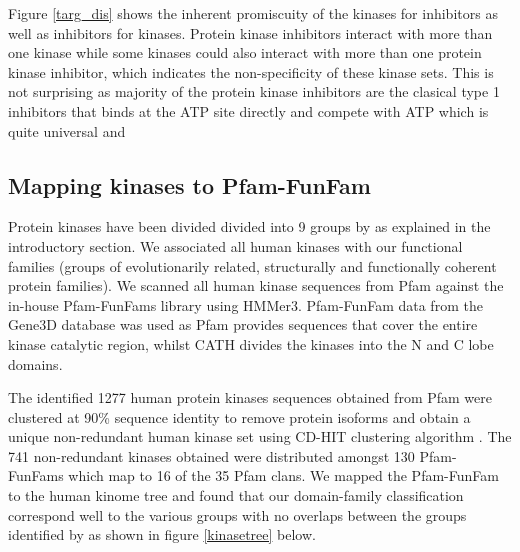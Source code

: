 \documentclass[a4paper, 11pt]{article}
\newcommand{\redcomment}[1]{\textcolor{red}{[#1]}} %
\begin{document}
Figure \ref{targ_dis} shows the inherent promiscuity of the kinases for inhibitors as well as inhibitors for kinases. Protein kinase inhibitors interact with more than one kinase  while some kinases could also interact with more than one protein kinase inhibitor, which indicates the non-specificity of these kinase sets. This is not surprising as majority of the protein kinase inhibitors are the clasical type 1 inhibitors that binds at the ATP site directly and compete with ATP which is quite universal and

\subsection*{Mapping kinases to Pfam-FunFam}
Protein kinases have been divided divided into 9 groups by \cite{manning2002protein} as explained in the introductory section. We associated all human kinases with our functional families (groups of evolutionarily related, structurally and functionally coherent protein families). We scanned all human kinase sequences from Pfam against the in-house Pfam-FunFams library using HMMer3. Pfam-FunFam data from the Gene3D database was used as Pfam provides sequences that cover the entire kinase catalytic region, whilst CATH divides the kinases into the N and C lobe domains.\par
The identified 1277 human protein kinases sequences obtained from Pfam were clustered at 90\% sequence identity to remove protein isoforms and obtain a unique non-redundant human kinase set using CD-HIT clustering algorithm \cite{li2006cd}. The 741 non-redundant kinases obtained were distributed amongst 130 Pfam-FunFams which map to 16 of the 35 Pfam clans. We mapped the Pfam-FunFam to the human kinome tree and found that our domain-family classification correspond well to the various groups with no overlaps between the groups identified by \cite{manning2002protein} as shown in figure \ref{kinasetree} below. %
\end{document}
